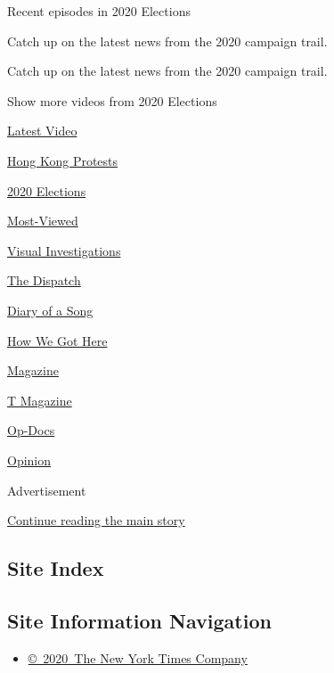 
Recent episodes in 2020 Elections

Catch up on the latest news from the 2020 campaign trail.

Catch up on the latest news from the 2020 campaign trail.

Show more videos from 2020 Elections

\href{/video}{}

\href{/video/latest-video}{Latest Video}

\href{/video/hk-protest}{Hong Kong Protests}

\href{/video/2020-Elections}{2020 Elections}

\href{/video/Most-Viewed}{Most-Viewed}

\href{/video/investigations}{Visual Investigations}

\href{/video/on-the-ground}{The Dispatch}

\href{/video/diaryofasong}{Diary of a Song}

\href{/video/how-we-got-here}{How We Got Here}

\href{/video/magazine}{Magazine}

\href{/video/t-magazine}{T Magazine}

\href{/video/op-docs}{Op-Docs}

\href{/video/opinion}{Opinion}

Advertisement

\protect\hyperlink{after-bottom}{Continue reading the main story}

\hypertarget{site-index}{%
\subsection{Site Index}\label{site-index}}

\hypertarget{site-information-navigation}{%
\subsection{Site Information
Navigation}\label{site-information-navigation}}

\begin{itemize}
\tightlist
\item
  \href{https://help.nytimes3xbfgragh.onion/hc/en-us/articles/115014792127-Copyright-notice}{©~2020~The
  New York Times Company}
\end{itemize}


